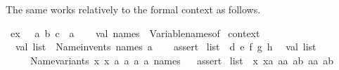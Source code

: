 \begin{isabellebody}
%
\isadelimML
%
\endisadelimML
%
\begin{isamarkuptext}%
\medskip The same works relatively to the formal context as
  follows.%
\end{isamarkuptext}%
\isamarkuptrue%
\isamarkupfalse%
\ ex\ {\isacharequal}\ \ a\ b\ c\ {\isacharcolon}{\isacharcolon}\ {\isacharprime}a\isanewline
{}\isanewline
%
\isadelimML
\isanewline
%
\endisadelimML
%
\isatagML
{}\isamarkupfalse%
\ {\isacharverbatimopen}\isanewline
\ \ val\ names\ {\isacharequal}\ Variable{\isachardot}names{\isacharunderscore}of\ %
\isaantiq
context%
\endisaantiq
{\isacharsemicolon}\isanewline
\isanewline
\ \ val\ list{}\ {\isacharequal}\ Name{\isachardot}invents\ names\ {\isachardoublequote}a{\isachardoublequote}\ {}{\isacharsemicolon}\isanewline
\ \ %
\isaantiq
assert%
\endisaantiq
\ {\isacharparenleft}list{}\ {\isacharequal}\ {\isacharbrackleft}{\isachardoublequote}d{\isachardoublequote}{\isacharcomma}\ {\isachardoublequote}e{\isachardoublequote}{\isacharcomma}\ {\isachardoublequote}f{\isachardoublequote}{\isacharcomma}\ {\isachardoublequote}g{\isachardoublequote}{\isacharcomma}\ {\isachardoublequote}h{\isachardoublequote}{\isacharbrackright}{\isacharparenright}{\isacharsemicolon}\isanewline
\isanewline
\ \ val\ list{}\ {\isacharequal}\isanewline
\ \ \ \ {\isacharhash}{}\ {\isacharparenleft}Name{\isachardot}variants\ {\isacharbrackleft}{\isachardoublequote}x{\isachardoublequote}{\isacharcomma}\ {\isachardoublequote}x{\isachardoublequote}{\isacharcomma}\ {\isachardoublequote}a{\isachardoublequote}{\isacharcomma}\ {\isachardoublequote}a{\isachardoublequote}{\isacharcomma}\ {\isachardoublequote}{\isacharprime}a{\isachardoublequote}{\isacharcomma}\ {\isachardoublequote}{\isacharprime}a{\isachardoublequote}{\isacharbrackright}\ names{\isacharparenright}{\isacharsemicolon}\isanewline
\ \ %
\isaantiq
assert%
\endisaantiq
\ {\isacharparenleft}list{}\ {\isacharequal}\ {\isacharbrackleft}{\isachardoublequote}x{\isachardoublequote}{\isacharcomma}\ {\isachardoublequote}xa{\isachardoublequote}{\isacharcomma}\ {\isachardoublequote}aa{\isachardoublequote}{\isacharcomma}\ {\isachardoublequote}ab{\isachardoublequote}{\isacharcomma}\ {\isachardoublequote}{\isacharprime}aa{\isachardoublequote}{\isacharcomma}\ {\isachardoublequote}{\isacharprime}ab{\isachardoublequote}{\isacharbrackright}{\isacharparenright}{\isacharsemicolon}\isanewline
{\isacharverbatimclose}%
\endisatagML
{\isafoldML}%
%
\isadelimML
\isanewline

\end{isabellebody}
